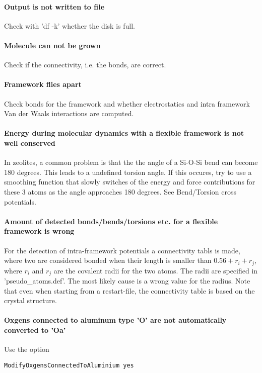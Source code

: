 \paragraph*{Output is not written to file}
Check with 'df -k' whether the disk is full.

\paragraph*{Molecule can not be grown}
Check if the connectivity, i.e. the bonds, are correct.

\paragraph*{Framework flies apart}
Check bonds for the framework and whether electrostatics and intra framework Van der Waals interactions are computed.

\paragraph*{Energy during molecular dynamics with a flexible framework is not well conserved}
In zeolites, a common problem is that the the angle of a Si-O-Si bend can become 180 degrees. This leads to a undefined torsion angle.
If this occures, try to use a smoothing function that slowly switches of the energy and force contributions for these 3 atoms as the angle
approaches 180 degrees. See Bend/Torsion cross potentials.

\paragraph*{Amount of detected bonds/bends/torsions etc. for a flexible framework is wrong}
For the detection of intra-framework potentials a connectivity tabls is made, where two are considered bonded when their length is smaller than
$0.56+r_i+r_j$, where $r_i$ and $r_j$ are the covalent radii for the two atoms. The radii are specified in 'pseudo\_atoms.def'. The most
likely cause is a wrong value for the radius. Note that even when starting from a restart-file, the connectivity table is based on the
crystal structure.

\paragraph*{Oxgens connected to aluminum type 'O' are not automatically converted to 'Oa'}
Use the option
\begin{verbatim}
ModifyOxgensConnectedToAluminium yes
\end{verbatim}

